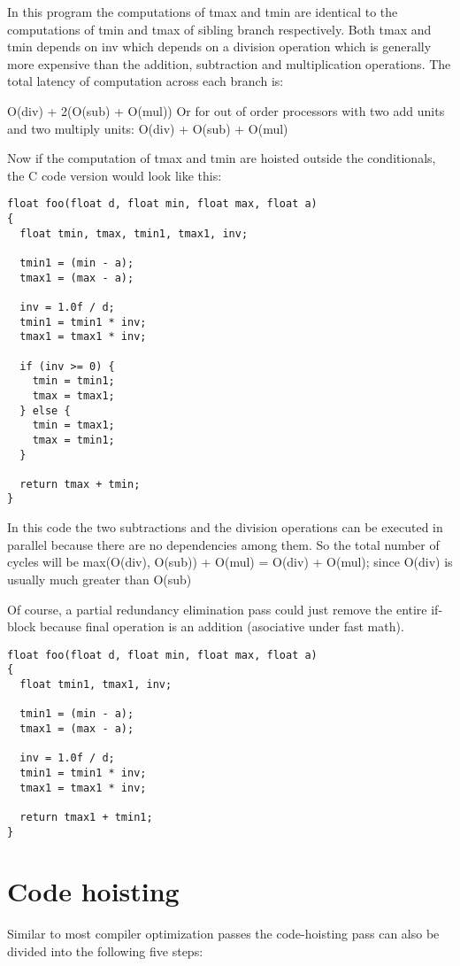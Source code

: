 \documentclass{sig-alternate}
\begin{document}
In this program the computations of tmax and tmin are identical to the
computations of tmin and tmax of sibling branch respectively. Both tmax and tmin
depends on inv which depends on a division operation which is generally more
expensive than the addition, subtraction and multiplication operations. The
total latency of computation across each branch is:

O(div) + 2(O(sub) + O(mul))
Or for out of order processors with two add units and two multiply units:
O(div) + O(sub) + O(mul)

Now if the computation of tmax and tmin are hoisted outside the
conditionals, the C code version would look like this:
\begin{verbatim}
float foo(float d, float min, float max, float a)
{
  float tmin, tmax, tmin1, tmax1, inv;

  tmin1 = (min - a);
  tmax1 = (max - a);

  inv = 1.0f / d;
  tmin1 = tmin1 * inv;
  tmax1 = tmax1 * inv;

  if (inv >= 0) {
    tmin = tmin1;
    tmax = tmax1;
  } else {
    tmin = tmax1;
    tmax = tmin1;
  }

  return tmax + tmin;
}

\end{verbatim}

In this code the two subtractions and the division operations can be executed in
parallel because there are no dependencies among them. So the total number of
cycles will be max(O(div), O(sub)) + O(mul) = O(div) + O(mul); since O(div) is
usually much greater than O(sub) \cite{x86,aarch64}

Of course, a partial redundancy elimination pass could just remove the entire
if-block because final operation is an addition (asociative under fast math).

\begin{verbatim}
float foo(float d, float min, float max, float a)
{
  float tmin1, tmax1, inv;

  tmin1 = (min - a);
  tmax1 = (max - a);

  inv = 1.0f / d;
  tmin1 = tmin1 * inv;
  tmax1 = tmax1 * inv;

  return tmax1 + tmin1;
}
\end{verbatim}


\newpage

\section{Code hoisting}
Similar to most compiler optimization passes the code-hoisting pass can also be
divided into the following five steps:
\end{document}
